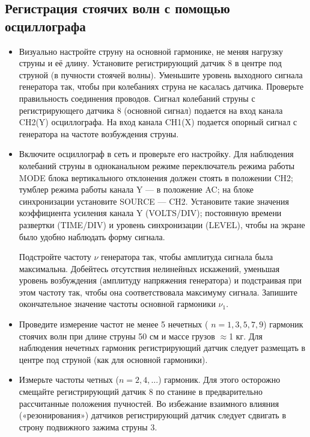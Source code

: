 \documentclass[a4paper,12pt]{article} %
\begin{document}
\subsection{Регистрация стоячих волн с помощью осциллографа}
\begin{itemize}


\item	Визуально настройте струну на основной гармонике, не меняя нагрузку струны и её длину. Установите регистрирующий датчик 8 в центре под струной (в пучности стоячей волны). Уменьшите уровень выходного сигнала генератора так, чтобы при колебаниях струна не касалась датчика. Проверьте правильность соединения проводов. Сигнал колебаний струны с регистрирующего датчика 8 (основной сигнал) подается на вход канала CH2(Y) осциллографа. На вход канала CH1(X) подается опорный сигнал с генератора на частоте возбуждения струны.

\item	Включите осциллограф в сеть и проверьте его настройку. Для наблюдения колебаний струны в одноканальном режиме переключатель режима работы MODE блока вертикального отклонения должен стоять в положении CH2; тумблер режима работы канала Y — в положение AC; на блоке синхронизации установите SOURCE — CH2. Установите такие значения коэффициента усиления канала Y (VOLTS/DIV); постоянную времени развертки (TIME/DIV) и уровень синхронизации (LEVEL), чтобы на экране было удобно наблюдать форму сигнала.

Подстройте частоту $\nu$ генератора так, чтобы амплитуда сигнала была максимальна. Добейтесь отсутствия нелинейных искажений, уменьшая уровень возбуждения (амплитуду напряжения генератора) и подстраивая при этом частоту так, чтобы она соответствовала максимуму сигнала. Запишите окончательное значение частоты основной гармоники $\nu_1$.

\item Проведите измерение частот не менее 5 нечетных ( $n= 1, 3, 5, 7, 9$) гармоник стоячих волн при длине струны 50 см и массе грузов $\approx$1 кг. Для наблюдения нечетных гармоник регистрирующий датчик следует размещать в центре под струной (как для основной гармоники).

\item Измерьте частоты четных ($n= 2, 4, …$) гармоник. Для этого осторожно смещайте регистрирующий датчик 8 по станине в предварительно рассчитанные положения пучностей. Во избежание взаимного влияния («резонирования») датчиков регистрирующий датчик следует сдвигать в строну подвижного зажима струны 3.


\end{itemize}
\end{document}
